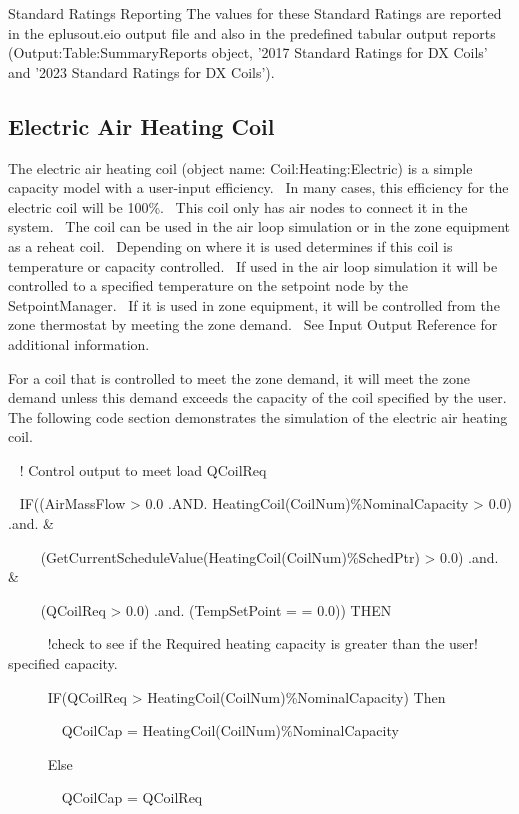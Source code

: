 Standard Ratings Reporting
The values for these Standard Ratings are reported in the eplusout.eio output file and also in the predefined tabular output reports (Output:Table:SummaryReports object, '2017 Standard Ratings for DX Coils' and '2023 Standard Ratings for DX Coils').

\subsection{Electric Air Heating Coil}\label{electric-air-heating-coil}

The electric air heating coil (object name: Coil:Heating:Electric) is a simple capacity model with a user-input efficiency.~ In many cases, this efficiency for the electric coil will be 100\%.~ This coil only has air nodes to connect it in the system.~ The coil can be used in the air loop simulation or in the zone equipment as a reheat coil.~ Depending on where it is used determines if this coil is temperature or capacity controlled.~ If used in the air loop simulation it will be controlled to a specified temperature on the setpoint node by the SetpointManager.~ If it is used in zone equipment, it will be controlled from the zone thermostat by meeting the zone demand.~ See Input Output Reference for additional information.

For a coil that is controlled to meet the zone demand, it will meet the zone demand unless this demand exceeds the capacity of the coil specified by the user.  The following code section demonstrates the simulation of the electric air heating coil.

~ ! Control output to meet load QCoilReq

~ IF((AirMassFlow \textgreater{} 0.0 .AND. HeatingCoil(CoilNum)\%NominalCapacity \textgreater{} 0.0) .and. \&

~~~~ (GetCurrentScheduleValue(HeatingCoil(CoilNum)\%SchedPtr) \textgreater{} 0.0) .and. \&

~~~~ (QCoilReq \textgreater{} 0.0) .and. (TempSetPoint = = 0.0)) THEN

~ ~~~~!check to see if the Required heating capacity is greater than the user! specified capacity.

~~~~~ IF(QCoilReq \textgreater{} HeatingCoil(CoilNum)\%NominalCapacity) Then

~~~~~~~ QCoilCap = HeatingCoil(CoilNum)\%NominalCapacity

~~~~~ Else

~~~~~~~ QCoilCap = QCoilReq

